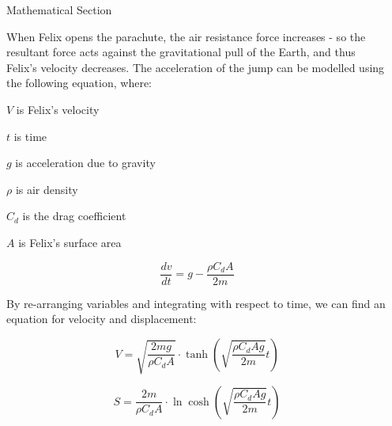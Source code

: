 \documentclass[final]{beamer}
\newlength{\sepwid}
\newlength{\onecolwid}
\newlength{\twocolwid}
\begin{document}
\begin{frame}
\begin{columns}[t]
\begin{column}{\sepwid}\end{column} %

\begin{column}{\twocolwid} %

\begin{columns}[t,totalwidth=\twocolwid] %

\begin{column}{\onecolwid}\vspace{-.74in} %


\begin{exampleblock}{Mathematical Section}

When Felix opens the parachute, the air resistance force increases - so the resultant force acts against the gravitational pull of the Earth, and thus Felix's velocity decreases. The acceleration of the jump can be modelled using the following equation, where:
\par $V$ is Felix's velocity
\par $t$ is time
\par $g$ is acceleration due to gravity
\par $\rho$ is air density
\par $C_d$ is the drag coefficient
\par $A$ is Felix's surface area

$$\frac{dv}{dt} = g - \frac{\rho C_d A}{2m}$$

\par By re-arranging variables and integrating with respect to time, we can find an equation for velocity and displacement:

$$V = \sqrt{\frac{2mg}{\rho C_d A}}\cdot\tanh{\left(\sqrt{\frac{\rho C_d A g}{2m}}t\right)}$$

$$S = \frac{2m}{\rho C_d A}\cdot\ln{\cosh{\left(\sqrt{\frac{\rho C_d A g}{2m}}t\right)}}$$


\end{exampleblock}
\end{column}
\end{columns}
\end{column}
\end{columns}
\end{frame}
\end{document}
